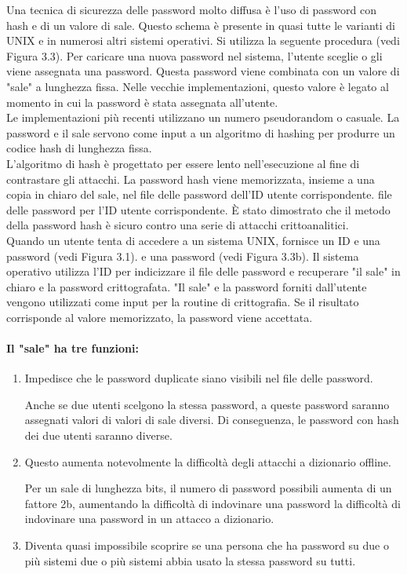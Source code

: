 Una tecnica di sicurezza delle password molto diffusa è l'uso di password con hash e di un valore di sale. Questo schema è presente in quasi tutte le varianti di UNIX e in numerosi altri sistemi operativi. Si utilizza la seguente procedura (vedi Figura 3.3). Per caricare una nuova password nel sistema, l'utente sceglie o gli viene assegnata una password. Questa password viene combinata con un valore di "sale" a lunghezza fissa. Nelle vecchie implementazioni, questo valore è legato al momento in cui la password è stata assegnata all'utente. 
\\
Le implementazioni più recenti utilizzano un numero pseudorandom o casuale. La password e il sale servono come input a un algoritmo di hashing per produrre un codice hash di lunghezza fissa.
\\
L'algoritmo di hash è progettato per essere lento nell'esecuzione al fine di contrastare gli attacchi. La password
hash viene memorizzata, insieme a una copia in chiaro del sale, nel file delle password dell'ID utente corrispondente.
file delle password per l'ID utente corrispondente. È stato dimostrato che il metodo della password hash è sicuro contro una serie di attacchi crittoanalitici.
\\
Quando un utente tenta di accedere a un sistema UNIX, fornisce un ID e una password (vedi Figura 3.1). e una password (vedi Figura 3.3b). Il sistema operativo utilizza l'ID per indicizzare il file delle password e recuperare "il sale" in chiaro e la password crittografata. "Il sale" e la password forniti dall'utente vengono utilizzati come input per la routine di crittografia. Se il risultato corrisponde al valore memorizzato, la password viene accettata.
\newpage
\paragraph{Il "sale" ha tre funzioni:}
\begin{enumerate}
    \item Impedisce che le password duplicate siano visibili nel file delle password. 
    
    Anche se due utenti scelgono la stessa password, a queste password saranno assegnati valori di valori di sale diversi. Di conseguenza, le password con hash dei due utenti saranno diverse.
    
    \item Questo aumenta notevolmente la difficoltà degli attacchi a dizionario offline. 
    
    Per un sale di lunghezza bits, il numero di password possibili aumenta di un fattore 2b, aumentando la difficoltà di indovinare una password la difficoltà di indovinare una password in un attacco a dizionario.
    
    \item Diventa quasi impossibile scoprire se una persona che ha password su due o più sistemi due o più sistemi abbia usato la stessa password su tutti.
    
\end{enumerate}

